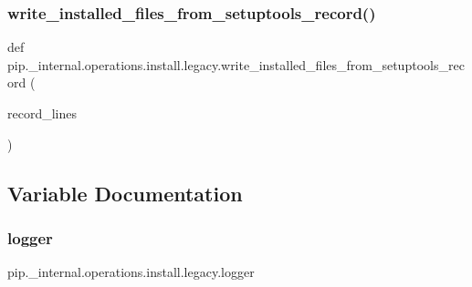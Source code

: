 \subsubsection{\texorpdfstring{write\+\_\+installed\+\_\+files\+\_\+from\+\_\+setuptools\+\_\+record()}{write\_installed\_files\_from\_setuptools\_record()}}
{\footnotesize\ttfamily def pip.\+\_\+internal.\+operations.\+install.\+legacy.\+write\+\_\+installed\+\_\+files\+\_\+from\+\_\+setuptools\+\_\+record (\begin{DoxyParamCaption}\item[{}]{record\+\_\+lines }\end{DoxyParamCaption})}



\subsection{Variable Documentation}
\mbox{\label{namespacepip_1_1__internal_1_1operations_1_1install_1_1legacy_ab5c7910a5b4f6b7fbf2214e454b27ba0}} 
\subsubsection{\texorpdfstring{logger}{logger}}
{\footnotesize\ttfamily pip.\+\_\+internal.\+operations.\+install.\+legacy.\+logger}

